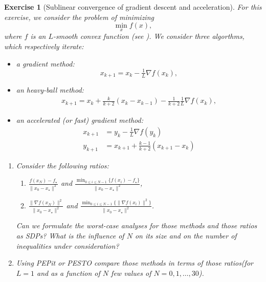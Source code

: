 \documentclass[11pt,a4paper]{article}
\newcommand{\pesto}{{PESTO }}
\newcommand{\pepit}{{PEPit }}
\newtheorem{exercise}{Exercise}
\begin{document}
	\begin{exercise}[Sublinear convergence of gradient descent and acceleration]\label{ex:accel1}
	For this exercise, we consider the problem of minimizing
	\[\min_{x} f(x),\]
	where $f$ is an $L$-smooth convex function (see ). We consider three algorthms, which respectively iterate:
	\begin{itemize}
	\item a gradient method:
	\[x_{k+1}=x_k-\tfrac{1}{L} \nabla f(x_k),\]
	\item an heavy-ball method:
	\begin{equation*}
	\begin{aligned}
	x_{k+1}=x_{k}+\tfrac{k}{k+2} (x_{k}-x_{k-1})-\tfrac{1}{k+2}\tfrac{1}{L} \nabla f(x_{k}),
	\end{aligned}
	\end{equation*}
	\item an accelerated (or fast) gradient method:
	\begin{equation*}
	\begin{aligned}
	x_{k+1}&=y_k-\tfrac{1}{L}\nabla f(y_k)\\
	y_{k+1}&=x_{k+1}+\tfrac{k-1}{k+2}(x_{k+1}-x_k)
	\end{aligned}
	\end{equation*}
	\end{itemize}
	\begin{enumerate}
	\item Consider the following ratios:
	\begin{enumerate}
	\item $\frac{f(x_N)-f_\star}{\|x_0-x_\star\|^2}$ and $\frac{\min_{0\leqslant i\leqslant N-1}\{f(x_i)-f_\star\}}{\|x_0-x_\star\|^2}$,
	\item $\frac{\|\nabla f(x_N)\|^2}{\|x_0-x_\star\|^2}$ and $\frac{\min_{0\leqslant i\leqslant N-1}\{\|\nabla f(x_i)\|^2\}}{\|x_0-x_\star\|^2}$.
	\end{enumerate}
	Can we formulate the worst-case analyses for those methods and those ratios as SDPs? What is the influence of $N$ on its size and on the number of inequalities under consideration?
	\item Using \pepit or \pesto compare those methods in terms of those ratios(for $L=1$ and as a function of $N$ few values of $N=0,1,\ldots,30$).
	\end{enumerate}
	\end{exercise}	
	
\end{document}
